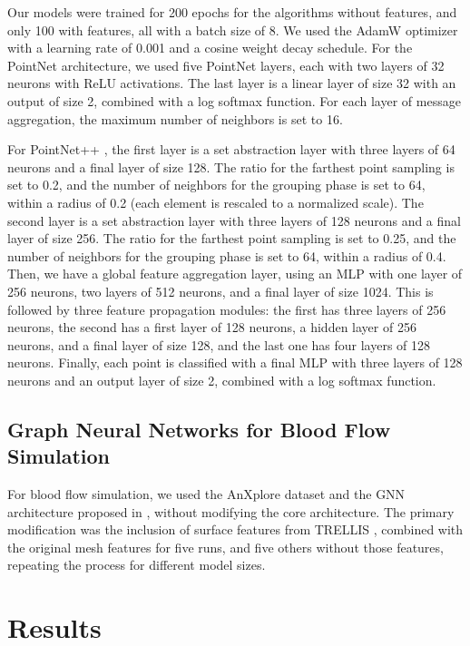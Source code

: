 \documentclass[%
 reprint,
 amsmath,amssymb,
 aps,
 floatfix,
 nofootinbib,
]{revtex4-2}
\begin{document}
Our models were trained for 200 epochs for the algorithms without features, and only 100 with features, all with a batch size of 8. We used the AdamW optimizer with a learning rate of 0.001 and a cosine weight decay schedule. For the PointNet \citep{pointnet} architecture, we used five PointNet layers, each with two layers of 32 neurons with ReLU activations. The last layer is a linear layer of size 32 with an output of size 2, combined with a log softmax function. For each layer of message aggregation, the maximum number of neighbors is set to 16.

For PointNet++ \citep{pointnetpp}, the first layer is a set abstraction layer with three layers of 64 neurons and a final layer of size 128. The ratio for the farthest point sampling is set to 0.2, and the number of neighbors for the grouping phase is set to 64, within a radius of 0.2 (each element is rescaled to a normalized scale). The second layer is a set abstraction layer with three layers of 128 neurons and a final layer of size 256. The ratio for the farthest point sampling is set to 0.25, and the number of neighbors for the grouping phase is set to 64, within a radius of 0.4. Then, we have a global feature aggregation layer, using an MLP with one layer of 256 neurons, two layers of 512 neurons, and a final layer of size 1024. This is followed by three feature propagation modules: the first has three layers of 256 neurons, the second has a first layer of 128 neurons, a hidden layer of 256 neurons, and a final layer of size 128, and the last one has four layers of 128 neurons. Finally, each point is classified with a final MLP with three layers of 128 neurons and an output layer of size 2, combined with a log softmax function.

\subsection{Graph Neural Networks for Blood Flow Simulation}

For blood flow simulation, we used the AnXplore dataset \citep{anxplore} and the GNN architecture proposed in \citep{graphphysics}, without modifying the core architecture. The primary modification was the inclusion of surface features from TRELLIS \citep{xiang2024structured}, combined with the original mesh features for five runs, and five others without those features, repeating the process for different model sizes.

\section{Results} \label{RESULTS}
\end{document}
